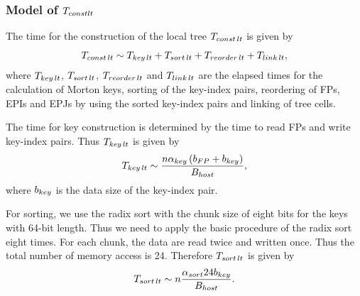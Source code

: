 \documentclass[dvipdfmx]{pasj01}
\begin{document}


\subsubsection{Model of $T_{\rm const lt}$}

The time for the construction of the local tree $T_{\rm const\, lt}$
is given by
\begin{equation}
  T_{\rm const\, lt}  \sim T_{\rm key\, lt} + T_{\rm sort\, lt} + T_{\rm reorder\, lt} + T_{\rm link\, lt},
\end{equation}
where $T_{\rm key\, lt}$, $T_{\rm sort\, lt}$, $T_{\rm reorder\, lt}$
and $T_{\rm link\, lt}$ are the elapsed times for the calculation of
Morton keys, sorting of the key-index pairs, reordering of FPs, EPIs
and EPJs by using the sorted key-index pairs and linking of tree
cells.

The time for key construction is determined by the time to read FPs
and write key-index pairs. Thus $T_{\rm key\, lt}$ is given by
\begin{equation}
  T_{\rm key\, lt}   \sim  \frac{n \alpha_{\rm key} \left( b_{\rm FP}+b_{\rm key} \right)}{B_{\rm host}},
  \label{eq:lt_key}
\end{equation}
where $b_{\rm key}$ is the data size of the key-index pair.

For sorting, we use the radix sort \citep{knuth1997} with the chunk
size of eight bits for the keys with 64-bit length. Thus we need to
apply the basic procedure of the radix sort eight times. For each
chunk, the data are read twice and written once. Thus the total number
of memory access is 24. Therefore $T_{\rm sort\, lt}$ is given by
\begin{equation}
T_{\rm sort\, lt}  \sim n \frac{\alpha_{\rm sort} 24 b_{\rm key}}{B_{\rm host}}.
\end{equation}
\end{document}
